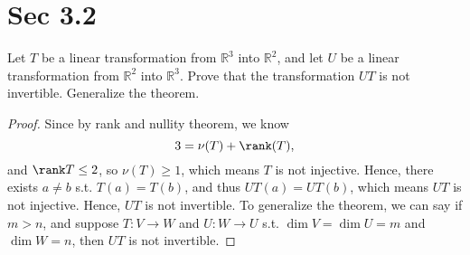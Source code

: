 \section*{Sec 3.2}

\begin{problem*}
    Let \(T\) be a linear transformation from \(\mathbb{R}^3\) into \(\mathbb{R}^2\), and let \(U\) be a linear transformation from \(\mathbb{R}^2\) into \(\mathbb{R}^3\). Prove that the transformation \(UT\) is not invertible. Generalize the theorem.
\end{problem*}
\begin{proof}
    Since by rank and nullity theorem, we know 
    \[
        3 = \nu(T) + \rank(T),
    \] and \(\rank T \le 2\), so \(\nu (T) \ge 1\), which means \(T\) is not injective. Hence, there exists \(a \neq b\) s.t. \(T(a) = T(b)\), and thus \(UT(a) = UT(b)\), which means \(UT\) is not injective. Hence, \(UT\) is not invertible. To generalize the theorem, we can say if \(m > n\), and suppose \(T: V \to W\) and \(U: W \to U\) s.t. \(\dim V = \dim U = m\) and \(\dim W = n\), then \(UT\) is not invertible.       
\end{proof}

